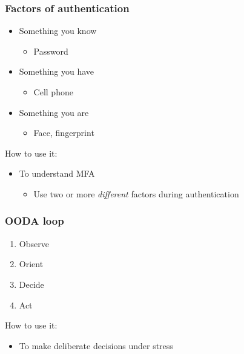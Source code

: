 \documentclass[blue]{beamer}
\begin{document}
\begin{frame}
\frametitle{Factors of authentication}

\begin{itemize}
  \item Something you know
  \begin{itemize}
    \item Password
  \end{itemize}
  \item Something you have
  \begin{itemize}
    \item Cell phone
  \end{itemize}
  \item Something you are
  \begin{itemize}
    \item Face, fingerprint
  \end{itemize}
\end{itemize}

\begin{alertblock}{How to use it:}
\begin{itemize}
  \item To understand MFA
  \begin{itemize}
    \item Use two or more \emph{different} factors during authentication
  \end{itemize}
\end{itemize}
\end{alertblock}

\end{frame}



\begin{frame}
\frametitle{OODA loop}

\begin{enumerate}
  \item Observe
  \item Orient
  \item Decide
  \item Act
\end{enumerate}

\begin{alertblock}{How to use it:}
\begin{itemize}
  \item To make deliberate decisions under stress
\end{itemize}
\end{alertblock}

\end{frame}
\end{document}
